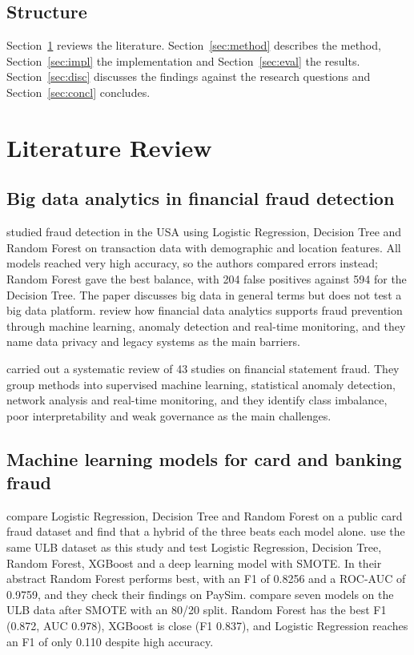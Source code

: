 \documentclass[12pt,a4paper]{article}
\begin{document}
\subsection{Structure}
Section~\ref{sec:lit} reviews the literature. Section~\ref{sec:method} describes the method, Section~\ref{sec:impl} the implementation and Section~\ref{sec:eval} the results. Section~\ref{sec:disc} discusses the findings against the research questions and Section~\ref{sec:concl} concludes.

\section{Literature Review}\label{sec:lit}

\subsection{Big data analytics in financial fraud detection}
\citet{jamil2025bigdata} studied fraud detection in the USA using Logistic Regression, Decision Tree and Random Forest on transaction data with demographic and location features. All models reached very high accuracy, so the authors compared errors instead; Random Forest gave the best balance, with 204 false positives against 594 for the Decision Tree. The paper discusses big data in general terms but does not test a big data platform. \citet{elumilade2025leveraging} review how financial data analytics supports fraud prevention through machine learning, anomaly detection and real-time monitoring, and they name data privacy and legacy systems as the main barriers.

\citet{gkegkas2025review} carried out a systematic review of 43 studies on financial statement fraud. They group methods into supervised machine learning, statistical anomaly detection, network analysis and real-time monitoring, and they identify class imbalance, poor interpretability and weak governance as the main challenges.

\subsection{Machine learning models for card and banking fraud}
\citet{salunke2025hybrid} compare Logistic Regression, Decision Tree and Random Forest on a public card fraud dataset and find that a hybrid of the three beats each model alone. \citet{albalawi2025enhancing} use the same ULB dataset as this study and test Logistic Regression, Decision Tree, Random Forest, XGBoost and a deep learning model with SMOTE. In their abstract Random Forest performs best, with an F1 of 0.8256 and a ROC-AUC of 0.9759, and they check their findings on PaySim. \citet{andrade2025smote} compare seven models on the ULB data after SMOTE with an 80/20 split. Random Forest has the best F1 (0.872, AUC 0.978), XGBoost is close (F1 0.837), and Logistic Regression reaches an F1 of only 0.110 despite high accuracy.
\end{document}
